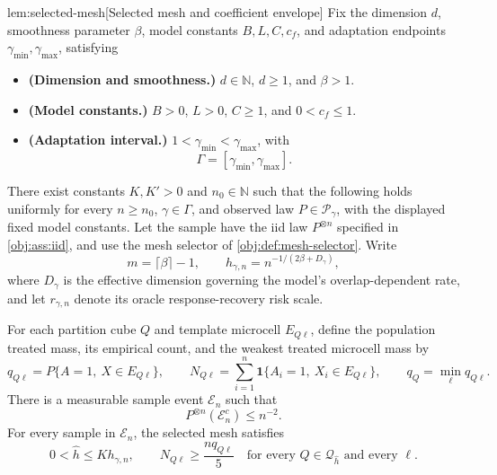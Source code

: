 \begin{lemmav}{lem:selected-mesh}[Selected mesh and coefficient envelope]
Fix the dimension \(d\), smoothness parameter \(\beta\), model constants \(B,L,C,c_f\), and adaptation endpoints \(\gamma_{\min},\gamma_{\max}\), satisfying
\begin{itemize}
\item \textbf{(Dimension and smoothness.)} \(d\in\mathbb N\), \(d\ge1\), and \(\beta>1\).
\item \textbf{(Model constants.)} \(B>0\), \(L>0\), \(C\ge1\), and \(0<c_f\le1\).
\item \textbf{(Adaptation interval.)} \(1<\gamma_{\min}<\gamma_{\max}\), with
\[
\Gamma=[\gamma_{\min},\gamma_{\max}].
\]
\end{itemize}
There exist constants \(K,K'>0\) and \(n_0\in\mathbb N\) such that the following holds uniformly for every \(n\ge n_0\), \(\gamma\in\Gamma\), and observed law \(P\in\mathcal P_\gamma\), with the displayed fixed model constants. Let the sample have the iid law \(P^{\otimes n}\) specified in \cref{obj:ass:iid}, and use the mesh selector of \cref{obj:def:mesh-selector}. Write
\[
m=\lceil\beta\rceil-1,
\qquad
h_{\gamma,n}=n^{-1/(2\beta+D_\gamma)},
\]
where \(D_\gamma\) is the effective dimension governing the model's overlap-dependent rate, and let \(r_{\gamma,n}\) denote its oracle response-recovery risk scale.

For each partition cube \(Q\) and template microcell \(E_{Q\ell}\), define the population treated mass, its empirical count, and the weakest treated microcell mass by
\[
q_{Q\ell}=P\{A=1,\ X\in E_{Q\ell}\},
\qquad
N_{Q\ell}=\sum_{i=1}^n
\mathbf1\{A_i=1,\ X_i\in E_{Q\ell}\},
\qquad
q_Q=\min_\ell q_{Q\ell}.
\]
There is a measurable sample event \(\mathcal E_n\) such that
\[
P^{\otimes n}(\mathcal E_n^c)\le n^{-2}.
\]
For every sample in \(\mathcal E_n\), the selected mesh satisfies
\[
0<\widehat h\le K h_{\gamma,n},
\qquad
N_{Q\ell}\ge \frac{nq_{Q\ell}}5
\quad
\text{for every }Q\in\mathcal Q_{\widehat h}
\text{ and every }\ell.
\]


\end{lemmav}
